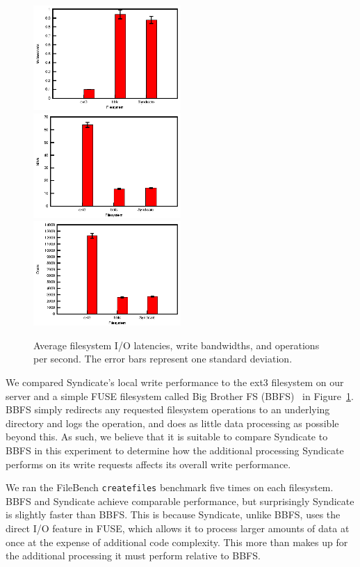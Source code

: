 \begin{figure}[h!]
\centering
\includegraphics[width=0.5\textwidth]{data/low-latency/latency}
\includegraphics[width=0.5\textwidth]{data/low-latency/write}
\includegraphics[width=0.5\textwidth]{data/low-latency/ops}
\caption{Average filesystem I/O latencies, write bandwidths, and operations per second.  The error bars represent one standard deviation.}
\label{fig:low-latency}
\end{figure}

We compared Syndicate's local write performance to the ext3 filesystem on our server and a simple FUSE filesystem
called Big Brother FS (BBFS)~\cite{fuse-tutorial} in Figure~\ref{fig:low-latency}.
BBFS simply redirects any requested filesystem operations to an underlying directory and 
logs the operation, and does as little data processing as possible beyond this.  As such, we believe
that it is suitable to compare Syndicate to BBFS in this experiment to determine how the additional
processing Syndicate performs on its write requests affects its overall write performance.

We ran the FileBench \texttt{createfiles} benchmark five times on each filesystem.
BBFS and Syndicate achieve comparable performance, but surprisingly Syndicate is slightly
faster than BBFS.  This is because Syndicate, unlike BBFS, uses the direct I/O feature in FUSE, which allows it
to process larger amounts of data at once at the expense of additional code complexity.
This more than makes up for the additional processing it must perform relative to BBFS.

